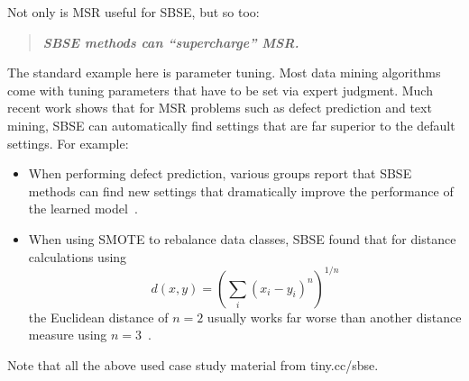 \documentclass[sigconf,anonymous,review]{acmart}
\begin{document}
Not only is   MSR useful for   SBSE, but so too:
\begin{quote}
\centering
{\bf {\em SBSE methods can    ``supercharge''    MSR.}}
\end{quote}
The standard example here is parameter tuning. Most data mining algorithms come with tuning
parameters that have to be set via expert judgment. Much recent work shows that for
MSR problems such as defect prediction and text mining, SBSE can automatically find settings that are far superior to the default settings. For example:
\begin{itemize}
 \item
   When performing defect prediction, various groups report that SBSE methods can find new settings that dramatically improve the performance of the learned model~\cite{fu2016tuning,tantithamthavorn2016automated, Tantithamthavorn2018}.

\item When using SMOTE to rebalance data classes, SBSE found that for 
distance calculations using 
  \[d(x,y)=\left(\sum_i(x_i-y_i)^n\right)^{1/n}\] the Euclidean distance of $n=2$ usually works far worse than another distance measure using $n=3$~\cite{agrawal2017better}.
 
\end{itemize} 
Note that all the above used case study material from tiny.cc/sbse.
\end{document}
